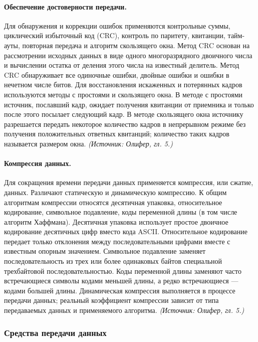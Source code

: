 \documentclass[a4paper,12pt]{article}
\begin{document}
\paragraph{Обеспечение достоверности передачи.}
Для обнаружения и коррекции ошибок применяются контрольные суммы, циклический избыточный код (CRC), контроль по паритету, квитанции, тайм-ауты, повторная передача и алгоритм скользящего окна. Метод CRC основан на рассмотрении исходных данных в виде одного многоразрядного двоичного числа и вычислении остатка от деления этого числа на известный делитель. Метод CRC обнаруживает все одиночные ошибки, двойные ошибки и ошибки в нечетном числе битов. Для восстановления искаженных и потерянных кадров используются методы с простоями и скользящего окна. В методе с простоями источник, пославший кадр, ожидает получения квитанции от приемника и только после этого посылает следующий кадр. В методе скользящего окна источнику разрешается передать некоторое количество кадров в непрерывном режиме без получения положительных ответных квитанций; количество таких кадров называется размером окна.
\textit{(Источник: Олифер, гл. 5.)}

\paragraph{Компрессия данных.}
Для сокращения времени передачи данных применяется компрессия, или сжатие, данных. Различают статическую и динамическую компрессию. К общим алгоритмам компрессии относятся десятичная упаковка, относительное кодирование, символьное подавление, коды переменной длины (в том числе алгоритм Хаффмана). Десятичная упаковка использует простое двоичное кодирование десятичных цифр вместо кода ASCII. Относительное кодирование передает только отклонения между последовательными цифрами вместе с известным опорным значением. Символьное подавление заменяет последовательность из трех или более одинаковых байтов специальной трехбайтовой последовательностью. Коды переменной длины заменяют часто встречающиеся символы кодами меньшей длины, а редко встречающиеся — кодами большей длины. Динамическая компрессия выполняется в процессе передачи данных; реальный коэффициент компрессии зависит от типа передаваемых данных и применяемого алгоритма.
\textit{(Источник: Олифер, гл. 5.)}

\subsubsection{Средства передачи данных}
\end{document}

